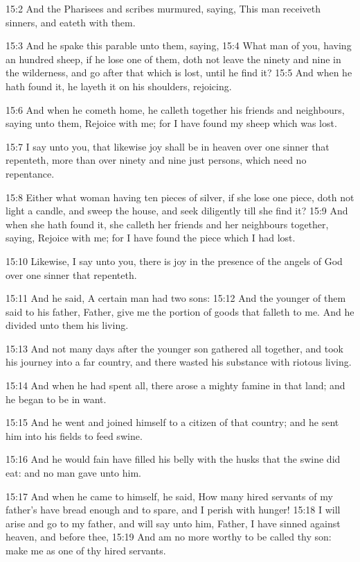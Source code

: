 15:2 And the Pharisees and scribes murmured, saying, This man receiveth sinners, and eateth with them.

15:3 And he spake this parable unto them, saying, 15:4 What man of you, having an hundred sheep, if he lose one of them, doth not leave the ninety and nine in the wilderness, and go after that which is lost, until he find it?  15:5 And when he hath found it, he layeth it on his shoulders, rejoicing.

15:6 And when he cometh home, he calleth together his friends and neighbours, saying unto them, Rejoice with me; for I have found my sheep which was lost.

15:7 I say unto you, that likewise joy shall be in heaven over one sinner that repenteth, more than over ninety and nine just persons, which need no repentance.

15:8 Either what woman having ten pieces of silver, if she lose one piece, doth not light a candle, and sweep the house, and seek diligently till she find it?  15:9 And when she hath found it, she calleth her friends and her neighbours together, saying, Rejoice with me; for I have found the piece which I had lost.

15:10 Likewise, I say unto you, there is joy in the presence of the angels of God over one sinner that repenteth.

15:11 And he said, A certain man had two sons: 15:12 And the younger of them said to his father, Father, give me the portion of goods that falleth to me. And he divided unto them his living.

15:13 And not many days after the younger son gathered all together, and took his journey into a far country, and there wasted his substance with riotous living.

15:14 And when he had spent all, there arose a mighty famine in that land; and he began to be in want.

15:15 And he went and joined himself to a citizen of that country; and he sent him into his fields to feed swine.

15:16 And he would fain have filled his belly with the husks that the swine did eat: and no man gave unto him.

15:17 And when he came to himself, he said, How many hired servants of my father's have bread enough and to spare, and I perish with hunger!  15:18 I will arise and go to my father, and will say unto him, Father, I have sinned against heaven, and before thee, 15:19 And am no more worthy to be called thy son: make me as one of thy hired servants.

